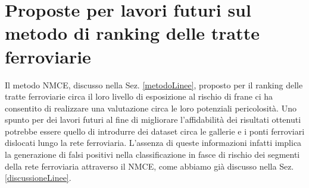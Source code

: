 \section{Proposte per lavori futuri sul metodo di ranking delle tratte ferroviarie}
Il metodo NMCE, discusso nella Sez. \ref{metodoLinee}, proposto per il ranking delle tratte ferroviarie circa il loro livello di esposizione al rischio di frane ci ha consentito di realizzare una valutazione circa le loro potenziali pericolosità. Uno spunto per dei lavori futuri al fine di migliorare l'affidabilità dei risultati ottenuti potrebbe essere quello di introdurre dei dataset circa le gallerie e i ponti ferroviari dislocati lungo la rete ferroviaria. L'assenza di queste informazioni infatti implica la generazione di falsi positivi  nella classificazione in fasce di rischio dei segmenti della rete ferroviaria attraverso il NMCE, come abbiamo già discusso nella Sez. \ref{discussioneLinee}.
